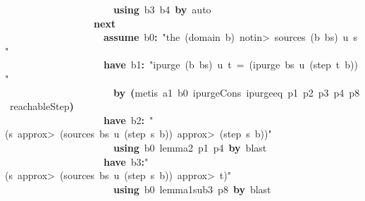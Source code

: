 \documentclass{article}
\newcommand{\syntaxKEYWORDA}[1]{\textcolor[rgb]{0.0,0.4,0.6}{\textbf{#1}}}
\newcommand{\syntaxKEYWORDC}[1]{\textcolor[rgb]{0.0,0.6,1.0}{\textbf{#1}}}
\newcommand{\syntaxLITERALA}[1]{\textcolor[rgb]{1.0,0.0,0.8}{#1}}
\newcommand{\syntaxOPERATOR}[1]{\textcolor[rgb]{0.0,0.0,0.0}{\textbf{#1}}}
\newcommand{\syntaxKEYWORDA}[1]{\textcolor[rgb]{0.0,0.4,0.6}{\textbf{#1}}}
\newcommand{\syntaxKEYWORDC}[1]{\textcolor[rgb]{0.0,0.6,1.0}{\textbf{#1}}}
\newcommand{\syntaxLITERALA}[1]{\textcolor[rgb]{1.0,0.0,0.8}{#1}}
\newcommand{\syntaxOPERATOR}[1]{\textcolor[rgb]{0.0,0.0,0.0}{\textbf{#1}}}
\newcommand{\syntaxKEYWORDA}[1]{\textcolor[rgb]{0.0,0.4,0.6}{\textbf{#1}}}
\newcommand{\syntaxKEYWORDC}[1]{\textcolor[rgb]{0.0,0.6,1.0}{\textbf{#1}}}
\newcommand{\syntaxLITERALA}[1]{\textcolor[rgb]{1.0,0.0,0.8}{#1}}
\newcommand{\syntaxOPERATOR}[1]{\textcolor[rgb]{0.0,0.0,0.0}{\textbf{#1}}}
\newcommand{\syntaxKEYWORDA}[1]{\textcolor[rgb]{0.0,0.4,0.6}{#1}}
\newcommand{\syntaxKEYWORDC}[1]{\textcolor[rgb]{0.0,0.6,1.0}{#1}}
\newcommand{\syntaxLITERALA}[1]{\textcolor[rgb]{1.0,0.0,0.8}{\textbf{#1}}}
\newcommand{\syntaxOPERATOR}[1]{\textcolor[rgb]{0.0,0.0,0.0}{#1}}
\newcommand{\syntaxKEYWORDA}[1]{\textcolor[rgb]{0.0,0.4,0.6}{\textbf{#1}}}
\newcommand{\syntaxKEYWORDC}[1]{\textcolor[rgb]{0.0,0.6,1.0}{\textbf{#1}}}
\newcommand{\syntaxLITERALA}[1]{\textcolor[rgb]{1.0,0.0,0.8}{#1}}
\newcommand{\syntaxOPERATOR}[1]{\textcolor[rgb]{0.0,0.0,0.0}{\textbf{#1}}}
\newcommand{\syntaxKEYWORDA}[1]{\textcolor[rgb]{0.0,0.4,0.6}{\textbf{#1}}}
\newcommand{\syntaxKEYWORDC}[1]{\textcolor[rgb]{0.0,0.6,1.0}{\textbf{#1}}}
\newcommand{\syntaxLITERALA}[1]{\textcolor[rgb]{1.0,0.0,0.8}{#1}}
\newcommand{\syntaxOPERATOR}[1]{\textcolor[rgb]{0.0,0.0,0.0}{\textbf{#1}}}
\begin{document}
{\ }{\ }{\ }{\ }{\ }{\ }{\ }{\ }{\ }{\ }{\ }{\ }{\ }{\ }{\ }{\ }{\ }{\ }{\ }{\ }{\ }{\ }\syntaxKEYWORDA{using}{\ }b3{\ }b4{\ }\syntaxKEYWORDA{by}{\ }auto\hspace*{\fill}\\
{\ }{\ }{\ }{\ }{\ }{\ }{\ }{\ }{\ }{\ }{\ }{\ }{\ }{\ }{\ }{\ }{\ }{\ }\syntaxKEYWORDA{next}\hspace*{\fill}\\
{\ }{\ }{\ }{\ }{\ }{\ }{\ }{\ }{\ }{\ }{\ }{\ }{\ }{\ }{\ }{\ }{\ }{\ }{\ }{\ }\syntaxKEYWORDC{assume}{\ }b0\syntaxOPERATOR{:}{\ }\syntaxLITERALA{"the{\ }(domain{\ }b){\ }\<notin>{\ }sources{\ }(b{\ }\usebox{\hashbox}{\ }bs){\ }u{\ }s"}\hspace*{\fill}\\
{\ }{\ }{\ }{\ }{\ }{\ }{\ }{\ }{\ }{\ }{\ }{\ }{\ }{\ }{\ }{\ }{\ }{\ }{\ }{\ }\syntaxKEYWORDA{have}{\ }b1\syntaxOPERATOR{:}{\ }\syntaxLITERALA{"ipurge{\ }(b{\ }\usebox{\hashbox}{\ }bs){\ }u{\ }t{\ }={\ }(ipurge{\ }bs{\ }u{\ }(step{\ }t{\ }b))"}\hspace*{\fill}\\
{\ }{\ }{\ }{\ }{\ }{\ }{\ }{\ }{\ }{\ }{\ }{\ }{\ }{\ }{\ }{\ }{\ }{\ }{\ }{\ }{\ }{\ }\syntaxKEYWORDA{by}{\ }\syntaxOPERATOR{(}metis{\ }a1{\ }b0{\ }ipurge\usebox{\underscorebox}Cons{\ }ipurge\usebox{\underscorebox}eq{\ }p1{\ }p2{\ }p3{\ }p4{\ }p8{\ }reachableStep\syntaxOPERATOR{)}\hspace*{\fill}\\
{\ }{\ }{\ }{\ }{\ }{\ }{\ }{\ }{\ }{\ }{\ }{\ }{\ }{\ }{\ }{\ }{\ }{\ }{\ }{\ }\syntaxKEYWORDA{have}{\ }b2\syntaxOPERATOR{:}{\ }\syntaxLITERALA{"(s{\ }\<approx>{\ }(sources{\ }bs{\ }u{\ }(step{\ }s{\ }b)){\ }\<approx>{\ }(step{\ }s{\ }b))"}\hspace*{\fill}\\
{\ }{\ }{\ }{\ }{\ }{\ }{\ }{\ }{\ }{\ }{\ }{\ }{\ }{\ }{\ }{\ }{\ }{\ }{\ }{\ }{\ }{\ }\syntaxKEYWORDA{using}{\ }b0{\ }lemma\usebox{\underscorebox}2{\ }p1{\ }p4{\ }\syntaxKEYWORDA{by}{\ }blast\hspace*{\fill}\\
{\ }{\ }{\ }{\ }{\ }{\ }{\ }{\ }{\ }{\ }{\ }{\ }{\ }{\ }{\ }{\ }{\ }{\ }{\ }{\ }\syntaxKEYWORDA{have}{\ }b3\syntaxOPERATOR{:}\syntaxLITERALA{"(s{\ }\<approx>{\ }(sources{\ }bs{\ }u{\ }(step{\ }s{\ }b)){\ }\<approx>{\ }t)"}\hspace*{\fill}\\
{\ }{\ }{\ }{\ }{\ }{\ }{\ }{\ }{\ }{\ }{\ }{\ }{\ }{\ }{\ }{\ }{\ }{\ }{\ }{\ }{\ }{\ }\syntaxKEYWORDA{using}{\ }b0{\ }lemma\usebox{\underscorebox}1\usebox{\underscorebox}sub\usebox{\underscorebox}3{\ }p8{\ }\syntaxKEYWORDA{by}{\ }blast\hspace*{\fill}\\
\end{document}
